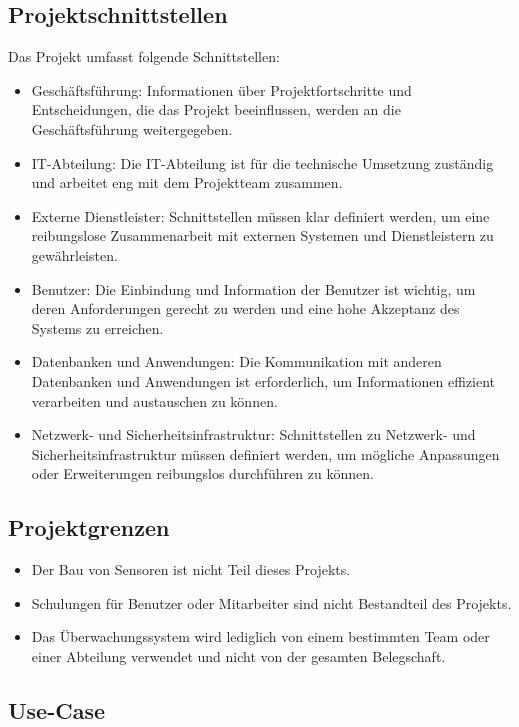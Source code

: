\begin{flushleft}
	\subsection{Projektschnittstellen}
	Das Projekt umfasst folgende Schnittstellen:
	\begin{itemize}
	\item Geschäftsführung: Informationen über Projektfortschritte und Entscheidungen, die das Projekt beeinflussen, werden an die Geschäftsführung weitergegeben.
	\item IT-Abteilung: Die IT-Abteilung ist für die technische Umsetzung zuständig und arbeitet eng mit dem Projektteam zusammen.
	\item Externe Dienstleister: Schnittstellen müssen klar definiert werden, um eine reibungslose Zusammenarbeit mit externen Systemen und Dienstleistern zu gewährleisten.
	\item Benutzer: Die Einbindung und Information der Benutzer ist wichtig, um deren Anforderungen gerecht zu werden und eine hohe Akzeptanz des Systems zu erreichen.
	\item Datenbanken und Anwendungen: Die Kommunikation mit anderen Datenbanken und Anwendungen ist erforderlich, um Informationen effizient verarbeiten und austauschen zu können.
	\item Netzwerk- und Sicherheitsinfrastruktur: Schnittstellen zu Netzwerk- und Sicherheitsinfrastruktur müssen definiert werden, um mögliche Anpassungen oder Erweiterungen reibungslos durchführen zu können.
	\end{itemize}
	\subsection{Projektgrenzen}
	\begin{itemize}
	\item Der Bau von Sensoren ist nicht Teil dieses Projekts.
	\item Schulungen für Benutzer oder Mitarbeiter sind nicht Bestandteil des Projekts.
	\item Das Überwachungssystem wird lediglich von einem bestimmten Team oder einer Abteilung verwendet und nicht von der gesamten Belegschaft.
	\end{itemize}
	\subsection{Use-Case}

\end{flushleft}
